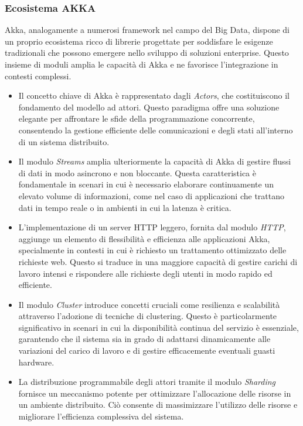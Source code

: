 \subsubsection[Ecosistema]{Ecosistema AKKA}
Akka, analogamente a numerosi framework nel campo del Big Data, dispone di un proprio ecosistema ricco di librerie progettate per soddisfare le esigenze tradizionali che possono emergere nello sviluppo di soluzioni enterprise.
Questo insieme di moduli amplia le capacità di Akka e ne favorisce l'integrazione in contesti complessi.

\begin{itemize}
  \item Il concetto chiave di Akka è rappresentato dagli \textit{Actors}, che costituiscono il fondamento del modello ad attori.
  Questo paradigma offre una soluzione elegante per affrontare le sfide della programmazione concorrente, consentendo la gestione efficiente delle comunicazioni e degli stati all'interno di un sistema distribuito.
  \item Il modulo \textit{Streams} amplia ulteriormente la capacità di Akka di gestire flussi di dati in modo asincrono e non bloccante.
  Questa caratteristica è fondamentale in scenari in cui è necessario elaborare continuamente un elevato volume di informazioni, come nel caso di applicazioni che trattano dati in tempo reale o in ambienti in cui la latenza è critica.
  \item L'implementazione di un server HTTP leggero, fornita dal modulo \textit{HTTP}, aggiunge un elemento di flessibilità e efficienza alle applicazioni Akka, specialmente in contesti in cui è richiesto un trattamento ottimizzato delle richieste web.
  Questo si traduce in una maggiore capacità di gestire carichi di lavoro intensi e rispondere alle richieste degli utenti in modo rapido ed efficiente.
  \item Il modulo \textit{Cluster} introduce concetti cruciali come resilienza e scalabilità attraverso l'adozione di tecniche di clustering.
  Questo è particolarmente significativo in scenari in cui la disponibilità continua del servizio è essenziale, garantendo che il sistema sia in grado di adattarsi dinamicamente alle variazioni del carico di lavoro e di gestire efficacemente eventuali guasti hardware.
  \item La distribuzione programmabile degli attori tramite il modulo \textit{Sharding} fornisce un meccanismo potente per ottimizzare l'allocazione delle risorse in un ambiente distribuito.
  Ciò consente di massimizzare l'utilizzo delle risorse e migliorare l'efficienza complessiva del sistema.

\end{itemize}
